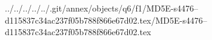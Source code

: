 ../../../../../.git/annex/objects/q6/f1/MD5E-s4476--d115837c34ac237f05b788f866e67d02.tex/MD5E-s4476--d115837c34ac237f05b788f866e67d02.tex